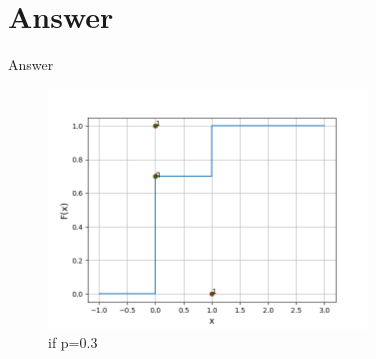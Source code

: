 \documentclass{beamer}
\begin{document}
	\section{Answer}
	\begin{frame}{Answer}
	   \begin{figure}
	     \centering
	     \includegraphics[scale=1]{figures/Figure_1.png} 
	     \caption{if p=0.3}
	     \label{figure 1}
        \end{figure}	     
	\end{frame}
	
\end{document}

